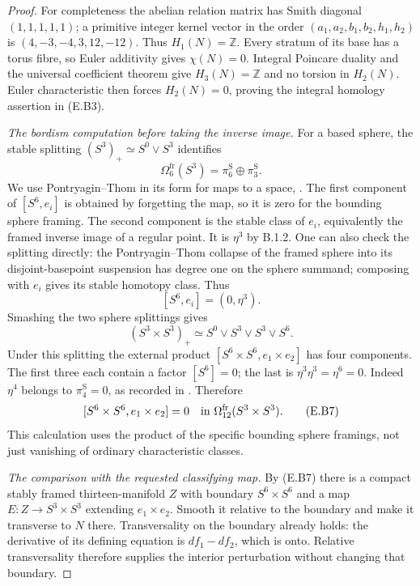 \begin{proof}
For completeness the abelian relation matrix has Smith
diagonal $(1,1,1,1,1)$; a primitive integer kernel vector in
the order $(a_1,a_2,b_1,b_2,h_1,h_2)$ is
$(4,-3,-4,3,12,-12)$. Thus $H_1(N)=\mathbb Z$.
Every stratum of its base has a torus fibre, so Euler
additivity gives $\chi(N)=0$. Integral Poincare duality and
the universal coefficient theorem give $H_3(N)=\mathbb Z$
and no torsion in $H_2(N)$. Euler characteristic then forces
$H_2(N)=0$, proving the integral homology assertion in (E.B3).

\emph{The bordism computation before taking the inverse image.}
For a based sphere, the stable splitting
$(S^3)_+\simeq S^0\vee S^3$ identifies
\[
 \Omega^{\mathrm{fr}}_6(S^3)
       =\pi^{\mathrm S}_6\oplus\pi^{\mathrm S}_3.
 \tag{E.B6}
\]
We use Pontryagin--Thom in its form for maps to a space,
\cite[Definition 8.16 and Theorem 8.17]{rootDavisKirk01}.
The first component of $[S^6,e_i]$ is obtained by forgetting
the map, so it is zero for the bounding sphere framing.
The second component is the stable class of $e_i$, equivalently
the framed inverse image of a regular point. It is $\eta^3$
by B.1.2. One can also check the splitting directly: the
Pontryagin--Thom collapse of the framed sphere into its
disjoint-basepoint suspension has degree one on the sphere
summand; composing with $e_i$ gives its stable homotopy class.
Thus
\[
                         [S^6,e_i]=(0,\eta^3).
\]
Smashing the two sphere splittings gives
\[
 (S^3\times S^3)_+\simeq
       S^0\vee S^3\vee S^3\vee S^6.
\]
Under this splitting the external product
$[S^6\times S^6,e_1\times e_2]$ has four components.
The first three each contain a factor $[S^6]=0$; the last
is $\eta^3\eta^3=\eta^6=0$. Indeed $\eta^4$ belongs to
$\pi^{\mathrm S}_4=0$, as recorded in
\cite[Theorem 2.1 and Table 1]{rootIWX20}. Therefore
\[
 [S^6\times S^6,e_1\times e_2]=0
      \quad\hbox{in }\Omega^{\mathrm{fr}}_{12}(S^3\times S^3).
 \tag{E.B7}
\]
This calculation uses the product of the specific bounding
sphere framings, not just vanishing of ordinary characteristic
classes.

\emph{The comparison with the requested classifying map.}
By (E.B7) there is a compact stably framed thirteen-manifold
$Z$ with boundary $S^6\times S^6$ and a map
$E:Z\to S^3\times S^3$ extending $e_1\times e_2$.
Smooth it relative to the boundary and make it transverse
to $N$ there. Transversality on the boundary already holds:
the derivative of its defining equation is $df_1-df_2$,
which is onto. Relative transversality therefore supplies
the interior perturbation without changing that boundary.


\end{proof}
